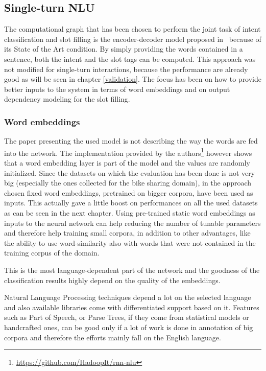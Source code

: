 \subsection{Single-turn NLU}
\label{approachSingleTurn}

The computational graph that has been chosen to perform the joint task of intent classification and slot filling is the encoder-decoder model proposed in~\cite{liu2016attention} because of its State of the Art condition. By simply providing the words contained in a sentence, both the intent and the slot tags can be computed. This approach was not modified for single-turn interactions, because the performance are already good as will be seen in chapter \ref{validation}. The focus has been on how to provide better inputs to the system in terms of word embeddings and on output dependency modeling for the slot filling.

\subsubsection{Word embeddings}
\label{approachWv}

The paper presenting the used model is not describing the way the words are fed into the network. The implementation provided by the authors\footnote{\url{https://github.com/HadoopIt/rnn-nlu}} however shows that a word embedding layer is part of the model and the values are randomly initialized. Since the datasets on which the evaluation has been done is not very big (especially the ones collected for the bike sharing domain), in the approach chosen fixed word embeddings, pretrained on bigger corpora, have been used as inputs. This actually gave a little boost on performances on all the used datasets as can be seen in the next chapter. Using pre-trained static word embeddings as inputs to the neural network can help reducing the number of tunable parameters and therefore help training small corpora, in addition to other advantages, like the ability to use word-similarity also with words that were not contained in the training corpus of the domain.

This is the most language-dependent part of the network and the goodness of the classification results highly depend on the quality of the embeddings.

Natural Language Processing techniques depend a lot on the selected language and also available libraries come with differentiated support based on it. Features such as Part of Speech, or Parse Trees, if they come from statistical models or handcrafted ones, can be good only if a lot of work is done in annotation of big corpora and therefore the efforts mainly fall on the English language.


